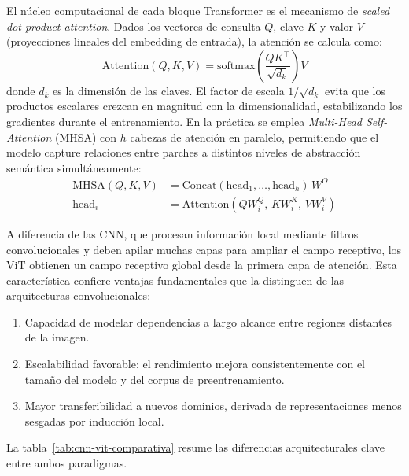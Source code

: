 El núcleo computacional de cada bloque Transformer es el mecanismo de \textit{scaled dot-product attention}. Dados los vectores de consulta $Q$, clave $K$ y valor $V$ (proyecciones lineales del embedding de entrada), la atención se calcula como:
\begin{equation}
\text{Attention}(Q, K, V) = \mathrm{softmax}\!\left(\frac{QK^\top}{\sqrt{d_k}}\right) V
\label{eq:attention}
\end{equation}
donde $d_k$ es la dimensión de las claves. El factor de escala $1/\sqrt{d_k}$ evita que los productos escalares crezcan en magnitud con la dimensionalidad, estabilizando los gradientes durante el entrenamiento. En la práctica se emplea \textit{Multi-Head Self-Attention} (\textsc{MHSA}) con $h$ cabezas de atención en paralelo, permitiendo que el modelo capture relaciones entre parches a distintos niveles de abstracción semántica simultáneamente:
\begin{equation}
\begin{split}
\text{MHSA}(Q,K,V) &= \mathrm{Concat}(\text{head}_1, \ldots, \text{head}_h)\,W^O \\
\text{head}_i &= \text{Attention}(QW_i^Q,\, KW_i^K,\, VW_i^V)
\end{split}
\label{eq:mhsa}
\end{equation}

A diferencia de las \acrshort{CNN}, que procesan información local mediante filtros convolucionales y deben apilar muchas capas para ampliar el campo receptivo, los \acrshort{ViT} obtienen un campo receptivo global desde la primera capa de atención. Esta característica confiere ventajas fundamentales que la distinguen de las arquitecturas convolucionales:
\begin{enumerate}
    \item Capacidad de modelar dependencias a largo alcance entre regiones distantes de la imagen.
    \item Escalabilidad favorable: el rendimiento mejora consistentemente con el tamaño del modelo y del corpus de preentrenamiento.
    \item Mayor transferibilidad a nuevos dominios, derivada de representaciones menos sesgadas por inducción local.
\end{enumerate}
La tabla~\ref{tab:cnn-vit-comparativa} resume las diferencias arquitecturales clave entre ambos paradigmas.

